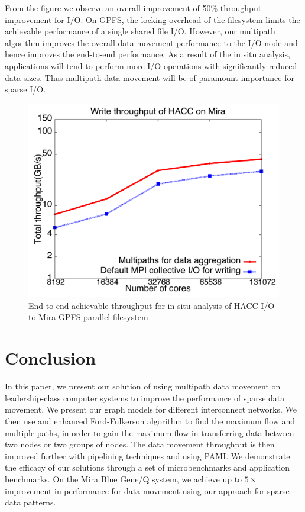 \documentclass[final,5p,times]{elsarticle}
\begin{document}
From the figure we observe an overall improvement of 50\% throughput improvement for I/O. On GPFS, the locking overhead of the filesystem limits the achievable performance of a single shared file I/O. However, our multipath algorithm improves the overall data movement performance to the I/O node and hence improves the end-to-end performance. As a result of the in situ analysis, applications will tend to perform more I/O operations with significantly reduced data sizes. Thus multipath data movement will be of paramount importance for sparse I/O.


\begin{figure}[!htb]
\centering
\includegraphics[scale=0.3]{hacc_agg.pdf}
\caption{End-to-end achievable throughput for in situ analysis of HACC I/O to Mira GPFS parallel filesystem }
\label{fig:hacc_file}
\end{figure}

\section{Conclusion} %
\label{sec:conclusion}
In this paper, we present our solution of using multipath data movement on leadership-class computer systems to improve the performance of sparse data movement. We present our graph models for different interconnect networks. We then use and enhanced Ford-Fulkerson algorithm to find the maximum flow and multiple paths, in order to gain the maximum flow in transferring data between two nodes or two groups of nodes. The data movement throughput is then improved further with pipelining techniques and using PAMI.  We demonstrate the efficacy of our solutions through a set of microbenchmarks and application benchmarks. On the Mira Blue Gene/Q system, we achieve up to $5\times$ improvement in performance for data movement using our approach for sparse data patterns.
\end{document}

